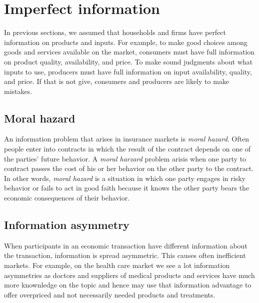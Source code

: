 
\pbn
\section{Imperfect information}\label{sec:imperfectinformation}

In previous sections, we assumed that households and firms have perfect information on products and inputs. For example, to make good choices among goods and services available on the market, consumers must have full information on product quality, availability, and price. To make sound judgments about what inputs to use, producers must have full information on input availability, quality, and price. If that is not give, consumers and producers are likely to make mistakes. 

\subsection{Moral hazard}
An information problem that arises in insurance markets is \textit{moral hazard}. Often people enter into contracts in which the result of the contract depends on one of the parties' future behavior. A \textit{moral harzard} problem arisis when one party to contract passes the cost of his or her behavior on the other party to the contract. In other words, \textit{moral hazard} is a situation in which one party engages in risky behavior or fails to act in good faith because it knows the other party bears the economic consequences of their behavior. 

\subsection{Information asymmetry}
When participants in an economic transaction have different information about the transaction, information is spread asymmetric. This causes often inefficient markets. For example, on the health care market we see a lot information asymmetries as doctors and suppliers of medical products and services have much more knownledge on the topic and hence may use that information advantage to offer overpriced and not necessarily needed products and treatments.

